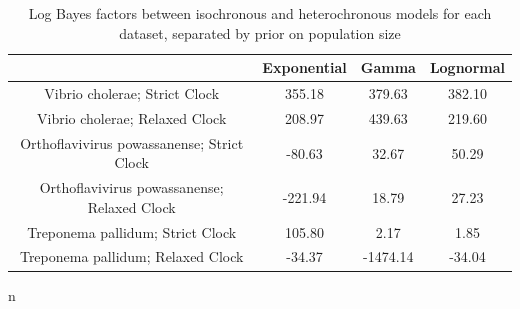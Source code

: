 \documentclass[11pt]{article}
\begin{document}
\begin{itemize}
\begin{center}
        \end{center}
        \begin{table}[H]
        \caption{Log Bayes factors between isochronous and heterochronous models for each dataset, separated by prior on population size}
        \begin{center}
        \begin{tabular}{ c | c c c }
         & Exponential & Gamma & Lognormal \\ 
        \hline
        Vibrio cholerae; Strict Clock & 355.18 & 379.63 & 382.10 \\  
        Vibrio cholerae; Relaxed Clock & 208.97 & 439.63 & 219.60 \\   
        Orthoflavivirus powassanense; Strict Clock & -80.63 & 32.67 & 50.29 \\  
        Orthoflavivirus powassanense; Relaxed Clock & -221.94 & 18.79  & 27.23 \\   
        Treponema pallidum; Strict Clock & 105.80 & 2.17 & 1.85 \\  
        Treponema pallidum; Relaxed Clock & -34.37 & -1474.14 & -34.04
        \end{tabular}n
        \end{center}
        \end{table}
    

\end{itemize}
\end{document}
